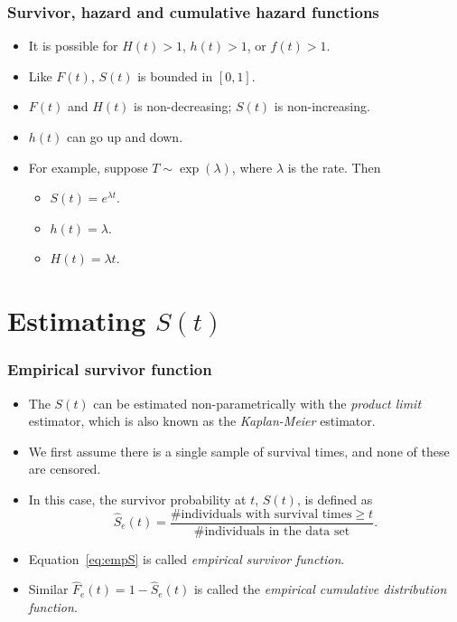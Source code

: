 \documentclass[10pt]{beamer}\usepackage[]{graphicx}\usepackage[]{color}
\newcommand{\empr}[1]{{\emph{\color{red}#1}}}
\begin{document}
\begin{frame}
  \frametitle{Survivor, hazard and cumulative hazard functions}
  \begin{itemize}
    \item It is possible for $H(t) > 1$, $h(t) > 1$, or $f(t) > 1$.
    \item Like $F(t)$, $S(t)$ is bounded in $[0, 1]$.
    \item $F(t)$ and $H(t)$ is non-decreasing; $S(t)$ is non-increasing.
    \item $h(t)$ can go up and down.
    \item For example, suppose $T\sim\exp(\lambda)$, where $\lambda$ is the rate. Then
      \begin{itemize}
      \item $S(t) = e^{\lambda t}$.
      \item $h(t) = \lambda$.
      \item $H(t) = \lambda t$.
  \end{itemize}
\end{itemize}
\end{frame}

\section{Estimating $S(t)$}

\begin{frame}
  \frametitle{Empirical survivor function}
  \begin{itemize}
  \item The $S(t)$ can be estimated non-parametrically with the \empr{product limit} estimator, 
    which is also known as the \empr{Kaplan-Meier} estimator.
  \item We first assume there is a single sample of survival times, 
    and none of these are censored. 
  \item In this case, the survivor probability at $t$, $S(t)$, is defined as 
    \begin{equation}
      \hat S_e(t) = \frac{\mbox{\# individuals with survival times} \ge t}{\mbox{\# individuals in the data set}}.
        \label{eq:empS}
    \end{equation}
  \item Equation~\eqref{eq:empS} is called \empr{empirical survivor function}. 
  \item Similar $\hat F_e(t) = 1 - \hat S_e(t)$ is called the \empr{empirical cumulative distribution function}.
    \end{itemize}
\end{frame}
\end{document}
